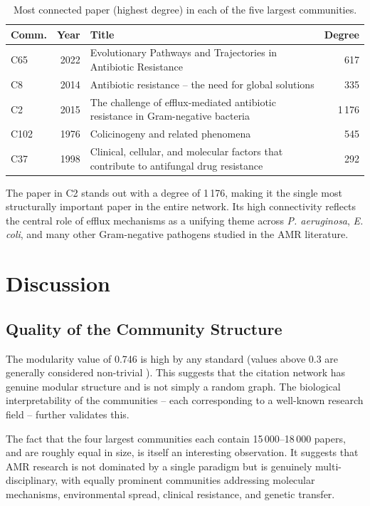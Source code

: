 \documentclass[12pt,a4paper]{article}
\begin{document}
\begin{table}[H]
\centering
\caption{Most connected paper (highest degree) in each of the five largest communities.}
\begin{tabular}{p{0.5cm}rp{8cm}r}
\toprule
\textbf{Comm.} & \textbf{Year} & \textbf{Title} & \textbf{Degree} \\
\midrule
C65  & 2022 & Evolutionary Pathways and Trajectories in Antibiotic Resistance & 617 \\
C8   & 2014 & Antibiotic resistance -- the need for global solutions              & 335 \\
C2   & 2015 & The challenge of efflux-mediated antibiotic resistance in Gram-negative bacteria & 1\,176 \\
C102 & 1976 & Colicinogeny and related phenomena                                  & 545 \\
C37  & 1998 & Clinical, cellular, and molecular factors that contribute to antifungal drug resistance & 292 \\
\bottomrule
\end{tabular}
\label{tab:top_papers}
\end{table}

The paper in C2 stands out with a degree of 1\,176, making it the single most structurally
important paper in the entire network.
Its high connectivity reflects the central role of efflux mechanisms as a unifying theme
across \textit{P. aeruginosa}, \textit{E. coli}, and many other Gram-negative pathogens
studied in the AMR literature.

\section{Discussion}

\subsection{Quality of the Community Structure}

The modularity value of 0.746 is high by any standard (values above 0.3 are generally
considered non-trivial \cite{fortunato2010}).
This suggests that the citation network has genuine modular structure and is not simply a
random graph.
The biological interpretability of the communities -- each corresponding to a well-known
research field -- further validates this.

The fact that the four largest communities each contain 15\,000--18\,000 papers, and
are roughly equal in size, is itself an interesting observation.
It suggests that AMR research is not dominated by a single paradigm but is genuinely
multi-disciplinary, with equally prominent communities addressing molecular mechanisms,
environmental spread, clinical resistance, and genetic transfer.
\end{document}
